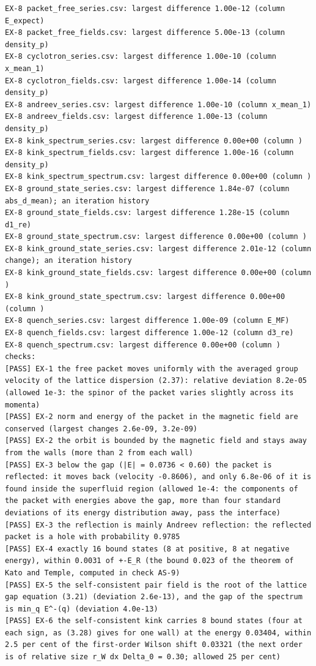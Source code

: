 \documentclass[
  10pt,
]{article}
\begin{document}
\begin{verbatim}
EX-8 packet_free_series.csv: largest difference 1.00e-12 (column E_expect)
EX-8 packet_free_fields.csv: largest difference 5.00e-13 (column density_p)
EX-8 cyclotron_series.csv: largest difference 1.00e-10 (column x_mean_1)
EX-8 cyclotron_fields.csv: largest difference 1.00e-14 (column density_p)
EX-8 andreev_series.csv: largest difference 1.00e-10 (column x_mean_1)
EX-8 andreev_fields.csv: largest difference 1.00e-13 (column density_p)
EX-8 kink_spectrum_series.csv: largest difference 0.00e+00 (column )
EX-8 kink_spectrum_fields.csv: largest difference 1.00e-16 (column density_p)
EX-8 kink_spectrum_spectrum.csv: largest difference 0.00e+00 (column )
EX-8 ground_state_series.csv: largest difference 1.84e-07 (column abs_d_mean); an iteration history
EX-8 ground_state_fields.csv: largest difference 1.28e-15 (column d1_re)
EX-8 ground_state_spectrum.csv: largest difference 0.00e+00 (column )
EX-8 kink_ground_state_series.csv: largest difference 2.01e-12 (column change); an iteration history
EX-8 kink_ground_state_fields.csv: largest difference 0.00e+00 (column )
EX-8 kink_ground_state_spectrum.csv: largest difference 0.00e+00 (column )
EX-8 quench_series.csv: largest difference 1.00e-09 (column E_MF)
EX-8 quench_fields.csv: largest difference 1.00e-12 (column d3_re)
EX-8 quench_spectrum.csv: largest difference 0.00e+00 (column )
checks:
[PASS] EX-1 the free packet moves uniformly with the averaged group velocity of the lattice dispersion (2.37): relative deviation 8.2e-05 (allowed 1e-3: the spinor of the packet varies slightly across its momenta)
[PASS] EX-2 norm and energy of the packet in the magnetic field are conserved (largest changes 2.6e-09, 3.2e-09)
[PASS] EX-2 the orbit is bounded by the magnetic field and stays away from the walls (more than 2 from each wall)
[PASS] EX-3 below the gap (|E| = 0.0736 < 0.60) the packet is reflected: it moves back (velocity -0.8606), and only 6.8e-06 of it is found inside the superfluid region (allowed 1e-4: the components of the packet with energies above the gap, more than four standard deviations of its energy distribution away, pass the interface)
[PASS] EX-3 the reflection is mainly Andreev reflection: the reflected packet is a hole with probability 0.9785
[PASS] EX-4 exactly 16 bound states (8 at positive, 8 at negative energy), within 0.0031 of +-E_R (the bound 0.023 of the theorem of Kato and Temple, computed in check AS-9)
[PASS] EX-5 the self-consistent pair field is the root of the lattice gap equation (3.21) (deviation 2.6e-13), and the gap of the spectrum is min_q E^-(q) (deviation 4.0e-13)
[PASS] EX-6 the self-consistent kink carries 8 bound states (four at each sign, as (3.28) gives for one wall) at the energy 0.03404, within 2.5 per cent of the first-order Wilson shift 0.03321 (the next order is of relative size r_W dx Delta_0 = 0.30; allowed 25 per cent)

\end{verbatim}
\end{document}
